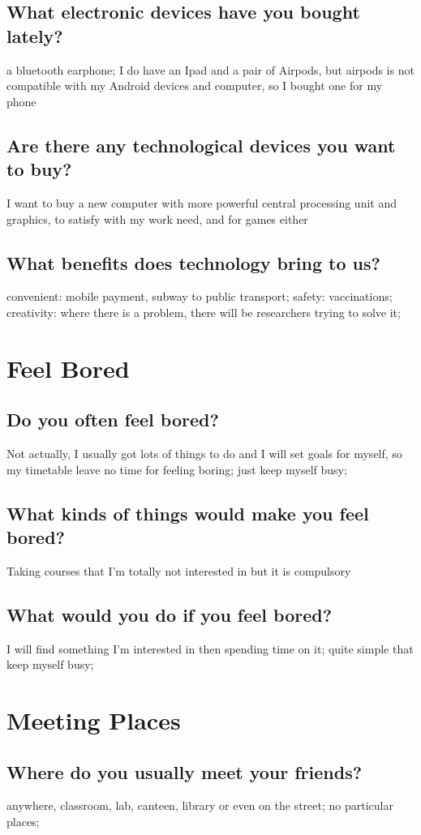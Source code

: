 \documentclass[conference]{IEEEtran}
\begin{document}
\subsection{What electronic devices have you bought lately?}
a bluetooth earphone;
I do have an Ipad and a pair of Airpods, but airpods is not compatible with
my Android devices and computer, so I bought one for my phone
\subsection{Are there any technological devices you want to buy?}
I want to buy a new computer with more powerful central processing unit and
graphics, to satisfy with my work need, and for games either
\subsection{What benefits does technology bring to us?}
convenient: mobile payment, subway to public transport;
safety: vaccinations;
creativity: where there is a problem, there will be researchers trying to
solve it;

\section{Feel Bored}
\subsection{Do you often feel bored?}
Not actually, I usually got lots of things to do and I will set goals for
myself, so my timetable leave no time for feeling boring;
just keep myself busy;
\subsection{What kinds of things would make you feel bored?}
Taking courses that I'm totally not interested in but it is compulsory
\subsection{What would you do if you feel bored?}
I will find something I'm interested in then spending time on it;
quite simple that keep myself busy;

\section{Meeting Places}
\subsection{Where do you usually meet your friends?}
anywhere, classroom, lab, canteen, library or even on the street;
no particular places;
\end{document}

